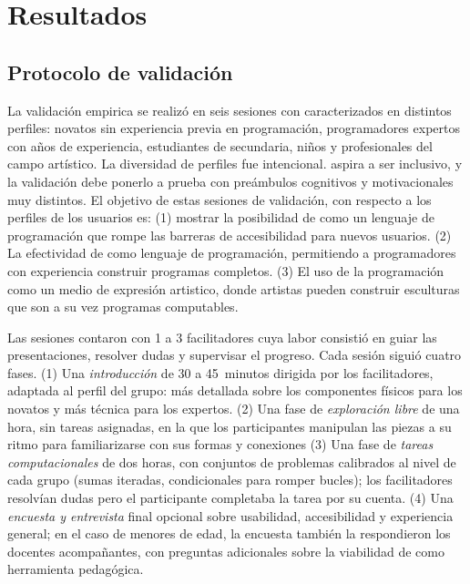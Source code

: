 
\section{Resultados}
\label{sec:results}

\subsection{Protocolo de validaci\'on}
\label{sec:results:validation}

La validaci\'on empirica se realiz\'o en seis sesiones con
caracterizados en distintos perfiles: novatos sin
experiencia previa en programaci\'on, programadores expertos con
a\~nos de experiencia, estudiantes de secundaria, ni\~nos y
profesionales del campo art\'istico. La diversidad de perfiles fue
intencional. \sculpt aspira a ser inclusivo, y la validaci\'on debe
ponerlo a prueba con pre\'ambulos cognitivos y motivacionales muy
distintos. El objetivo de estas sesiones de validación, con respecto
a los perfiles de los usuarios es: (1) mostrar la posibilidad de \sculpt
como un lenguaje de programación que rompe las barreras de accesibilidad
para nuevos usuarios. (2) La efectividad de \sculpt como lenguaje de programación,
permitiendo a programadores con experiencia construir programas completos.
(3) El uso de la programación como un medio de expresión artistico, donde
artistas pueden construir esculturas que son a su vez programas computables. 

Las sesiones contaron con 1 a 3 facilitadores cuya labor consisti\'o en
guiar las presentaciones, resolver dudas y supervisar el progreso.
Cada sesi\'on sigui\'o cuatro fases. (1) Una \emph{introducci\'on}
de 30 a 45~minutos dirigida por los facilitadores, adaptada al perfil del grupo: m\'as detallada
sobre los componentes f\'isicos para los novatos y m\'as t\'ecnica
para los expertos. (2) Una fase de \emph{exploraci\'on libre} de
una hora, sin tareas asignadas, en la que los participantes
manipulan las piezas a su ritmo para familiarizarse con sus formas
y conexiones (3) Una fase de \emph{tareas computacionales} de
dos horas, con conjuntos de problemas calibrados al nivel de cada
grupo (\eg sumas iteradas, condicionales para romper bucles); los
facilitadores resolv\'ian dudas pero el participante completaba la
tarea por su cuenta. (4) Una \emph{encuesta y entrevista} final opcional
sobre usabilidad, accesibilidad y experiencia general; en el caso
de menores de edad, la encuesta tambi\'en la respondieron los
docentes acompa\~nantes, con preguntas adicionales sobre la
viabilidad de \sculpt como herramienta pedag\'ogica.

